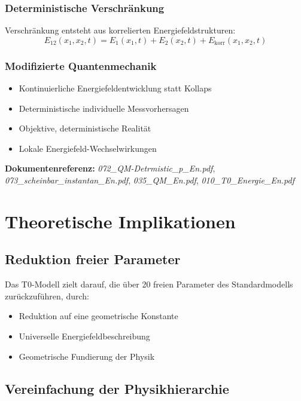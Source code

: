 \subsubsection{Deterministische Verschränkung}

Verschränkung entsteht aus korrelierten Energiefeldstrukturen:
\begin{equation}
	E_{12}(x_1,x_2,t) = E_1(x_1,t) + E_2(x_2,t) + E_{\text{korr}}(x_1,x_2,t)
\end{equation}

\subsubsection{Modifizierte Quantenmechanik}

\begin{itemize}
	\item Kontinuierliche Energiefeldentwicklung statt Kollaps
	\item Deterministische individuelle Messvorhersagen
	\item Objektive, deterministische Realität
	\item Lokale Energiefeld-Wechselwirkungen
\end{itemize}

\textbf{Dokumentenreferenz:} \textit{072\_QM-Detrmistic\_p\_En.pdf}, \textit{073\_scheinbar\_instantan\_En.pdf}, \textit{035\_QM\_En.pdf}, \textit{010\_T0\_Energie\_En.pdf}

\section{Theoretische Implikationen}

\subsection{Reduktion freier Parameter}

Das T0-Modell zielt darauf, die über 20 freien Parameter des Standardmodells zurückzuführen, durch:

\begin{itemize}
	\item Reduktion auf eine geometrische Konstante
	\item Universelle Energiefeldbeschreibung
	\item Geometrische Fundierung der Physik
\end{itemize}

\subsection{Vereinfachung der Physikhierarchie}


